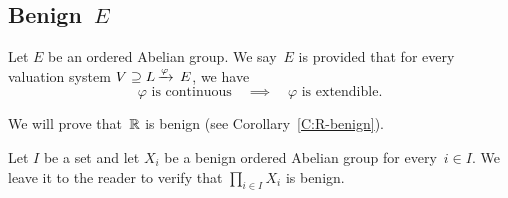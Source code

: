 \documentclass[main.tex]{subfiles}
\begin{document}
\subsection{Benign~$E$}
\begin{dfn}
\label{D:benign}
Let $E$ be an ordered Abelian group.
We say~$E$ is  provided 
that for every valuation system
$V \supseteq L\,\smash{\xrightarrow{\varphi}\,E}$,
we have
\begin{equation*}
\varphi\text{ is continuous}
\quad\implies\quad
\varphi\text{ is extendible}.
\end{equation*}
\end{dfn}
\begin{ex}
We will prove that~$\mathbb{R}$ is benign (see Corollary~\ref{C:R-benign}).
\end{ex}
\begin{ex}
Let $I$ be a set
and let $X_i$ be a benign ordered Abelian group
for every~$i\in I$.
We leave it to the reader to verify
that $\prod_{i \in I} X_i$ is benign.
\end{ex}
\end{document}
